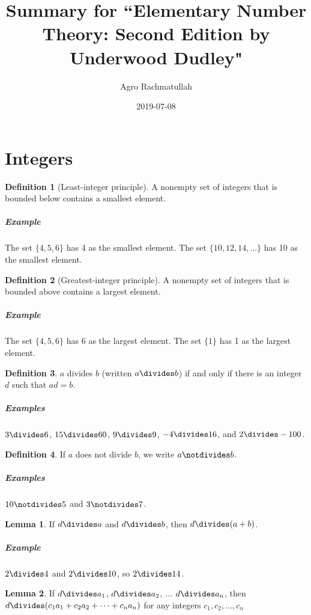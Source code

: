 \documentclass{article}
\title{Summary for ``Elementary Number Theory: Second Edition by Underwood Dudley"}
\date{2019-07-08}
\author{Agro Rachmatullah}
\theoremstyle{definition} %
\theoremstyle{definition}
\theoremstyle{definition}
\newtheorem{lemma}{Lemma}[section]
\theoremstyle{definition}
\newtheorem{definition}{Definition}[section]
\begin{document}
  \maketitle
  
  \newpage
  \section{Integers}
  
  \begin{definition}[Least-integer principle]
  A nonempty set of integers that is bounded below contains a smallest element.
  \end{definition}
  
  \subparagraph{Example} The set $\{4, 5, 6\}$ has 4 as the smallest element. The set $\{10, 12, 14, \dots\}$ has 10 as the smallest element.
  
  \begin{definition}[Greatest-integer principle]
  A nonempty set of integers that is bounded above contains a largest element.
  \end{definition}
  
  \subparagraph{Example} The set $\{4, 5, 6\}$ has 6 as the largest element. The set $\{1\}$ has 1 as the largest element.
  
  \begin{definition}
  $a$ divides $b$ (written $a \divides b$) if and only if there is an integer $d$ such that $ad = b$.
  
  \subparagraph{Examples} $3 \divides 6$, $15 \divides 60$, $9 \divides 9$, $-4 \divides 16$, and $2 \divides -100$.
  \end{definition}
  
  \begin{definition}
  If $a$ does not divide $b$, we write $a \notdivides b$.
  
  \subparagraph{Examples} $10 \notdivides 5$ and $3 \notdivides 7$.
  \end{definition}
  
  \begin{lemma}
    If $d \divides a$ and $d \divides b$, then $d \divides (a + b)$.
  \end{lemma}
  
  \subparagraph{Example} $2 \divides 4$ and $2 \divides 10$, so $2 \divides 14$.
  
  \begin{lemma}
    If $d \divides a_1$, $d \divides a_2$, $\dots$ $d \divides a_n$, then $d \divides (c_1a_1 + c_2a_2 + \dots + c_na_n)$ for any integers $c_1, c_2, \dots, c_n$
  \end{lemma}
  
\end{document}
